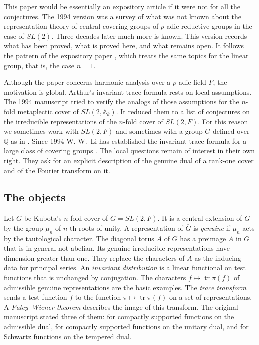 \documentclass[12pt,letterpaper]{article}
\numberwithin{equation}{section}
\theoremstyle{definition}
\newcommand{\Q}{\mathbb Q}
\newcommand{\bG}{\overline{G}}
\newcommand{\bA}{\overline{A}}
\DeclareMathOperator{\tr}{tr}
\begin{document}
This paper would be essentially an expository article if it were not for all the
conjectures.  The 1994 version was a survey of what was not known about the representation
theory of central covering groups of $p$-adic reductive groups in the case of $SL(2)$.
Three decades later much more is known.  This version records what has been proved, what
is proved here, and what remains open.  It follows the pattern of the expository paper
\cite{Jo94a}, which treats the same topics for the linear group, that is, the case $n=1$.

Although the paper concerns harmonic analysis over a $p$-adic field $F$, the motivation is
global.  Arthur's invariant trace formula \cite{Ar81} rests on local assumptions.  The
1994 manuscript tried to verify the analogs of those assumptions for the $n$-fold
metaplectic cover of $SL(2,\mathbb A_k)$.  It reduced them to a list of conjectures on the
irreducible representations of the $n$-fold cover of $SL(2,F)$.  For this reason we
sometimes work with $SL(2,F)$ and sometimes with a group $G$ defined over $\Q$ as in
\cite{Ar81}.  Since 1994 W.-W.~Li has established the invariant trace formula for a large
class of covering groups \cite{Li12,Li14}.  The local questions remain of interest in
their own right.  They ask for an explicit description of the genuine dual of a rank-one
cover and of the Fourier transform on it.

\subsection*{The objects}
Let $\bG$ be Kubota's $n$-fold cover of $G=SL(2,F)$.  It is a central extension of $G$ by
the group $\mu_n$ of $n$-th roots of unity.  A representation of $\bG$ is \emph{genuine}
if $\mu_n$ acts by the tautological character.  The diagonal torus $A$ of $G$ has a
preimage $\bA$ in $\bG$ that is in general not abelian.  Its genuine irreducible
representations have dimension greater than one.  They replace the characters of $A$ as
the inducing data for principal series.  An \emph{invariant distribution} is a linear
functional on test functions that is unchanged by conjugation.  The characters
$f\mapsto\tr\pi(f)$ of admissible genuine representations are the basic examples.  The
\emph{trace transform} sends a test function $f$ to the function
$\pi\mapsto\tr\pi(f)$ on a set of representations.  A \emph{Paley--Wiener theorem}
describes the image of this transform.  The original manuscript stated three of them:
for compactly supported functions on the admissible dual, for compactly supported functions
on the unitary dual, and for Schwartz functions on the tempered dual.
\end{document}
